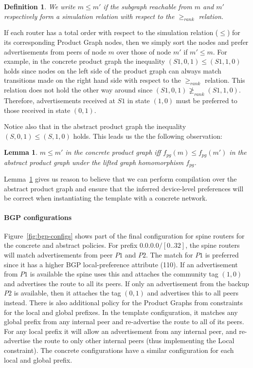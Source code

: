 \documentclass[numbers, 10pt, preprint]{sigplanconf}
\newcommand{\para}[1]{\paragraph*{\textbf{#1}}}
\newtheorem{defn}{Definition}
\newtheorem{lem}[thm]{Lemma}
\begin{document}
\begin{defn}
We write $m \leq m'$ if the subgraph reachable from $m$ and $m'$ respectively form a simulation relation with respect to the $\geq_{rank}$ relation.
\end{defn}

If each router has a total order with respect to the simulation relation ($\leq$) for its corresponding Product Graph nodes, then we simply sort the nodes and prefer advertisements from peers of node $m$ over those of node $m'$ if $m' \leq m$.
%
For example, in the concrete product graph the inequality $(S1,0,1) \leq (S1,1,0)$ holds since nodes on the left side of the product graph can always match transitions made on the right hand side with respect to the $\geq_{rank}$ relation. This relation does not hold the other way around since $(S1,0,1) \ngeq_{rank} (S1,1,0)$. Therefore, advertisements received at $S1$ in state $(1,0)$ must be preferred to those received in state $(0,1)$.

Notice also that in the abstract product graph the inequality $(S,0,1) \leq (S,1,0)$ holds. This leads us the the following observation:

\begin{lem}
\label{lem:preference}
$m \leq m'$ in the concrete product graph iff $f_{pg}(m) \leq f_{pg}(m')$ in the abstract product graph under the lifted graph homomorphism $f_{pg}$.
\end{lem}

Lemma~\ref{lem:preference} gives us reason to believe that we can perform compilation over the abstract product graph and ensure that the inferred device-level preferences will be correct when instantiating the template with a concrete network.



\para{BGP configurations}

Figure~\ref{fig:bgp-configs} shows part of the final configuration for spine routers for the concrete and abstract policies.
%
For prefix $0.0.0.0/[0..32]$, the spine routers will match advertisements from peer $P1$ and $P2$. The match for $P1$ is preferred since it has a higher BGP local-preference attribute (110). If an advertisement from $P1$ is available the spine uses this and attaches the community tag $(1,0)$ and advertises the route to all its peers. If only an advertisement from the backup $P2$ is available, then it attaches the tag $(0,1)$ and advertises this to all peers instead.
%
There is also additional policy for the Product Graphs from constraints for the local and global prefixes. In the template configuration, it matches any global prefix from any internal peer and re-advertise the route to all of its peers. For any local prefix it will allow an advertisement from any internal peer, and re-advertise the route to only other internal peers (thus implementing the Local constraint). The concrete configurations have a similar configuration for each local and global prefix.
\end{document}
